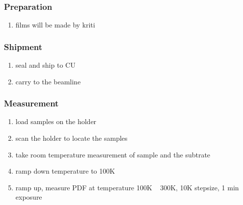 \documentclass[prl,aps,tighten,amsmath,amssymb,floatfix]{revtex4-1}
\begin{document}
\subsubsection{Preparation}
\begin{enumerate}
\item films will be made by kriti
\end{enumerate}
\subsubsection{Shipment}
\begin{enumerate}
\item seal and ship to CU
\item carry to the beamline
\end{enumerate}
\subsubsection{Measurement}
\begin{enumerate}
\item load samples on the holder
\item scan the holder to locate the samples
\item take room temperature measurement of sample and the subtrate
\item ramp down temperature to 100K
\item ramp up, measure PDF at temperature 100K ~ 300K, 10K stepsize, 1 min exposure
\end{enumerate}
\end{document}
